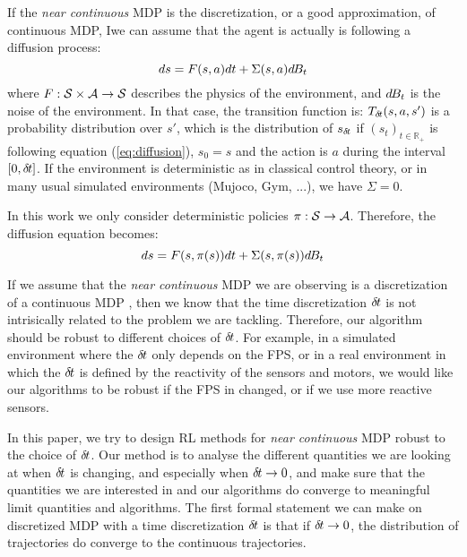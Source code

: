 
If the \emph{near continuous} MDP is the discretization, or a good approximation, of continuous MDP, Iwe can assume that the agent is actually is following a diffusion process:
\begin{equation}
  \label{eq:diffusion}
  ds = F(s, a)dt + \Sigma(s, a)d\hspace{-.1em}B_t
\end{equation}
where $F: {\cal S}\times{\cal A}\rightarrow {\cal S}$ describes the physics of the environment, and $d\hspace{-.1em}B_t$ is the noise of the environment. In that case, the transition function is: $T_{\delta\hspace{-.1em}t}(s, a, s')$ is a probability distribution over $s'$, which is the distribution of $s_{\delta\hspace{-.1em}t}$ if $(s_t)_{t\in\mathbb{R_+}}$ is following equation (\ref{eq:diffusion}), $s_0 = s$ and the action is $a$ during the interval $[0, {\delta\hspace{-.1em}t}]$. If the environment is deterministic as in classical control theory, or in many usual simulated environments (Mujoco, Gym, ...), we have $\Sigma = 0$.

In this work we only consider deterministic policies $\pi: {\cal S} \rightarrow {\cal A}$. Therefore, the diffusion equation becomes:
\begin{equation}
  \label{eq:diffusion-policy}
  ds = F(s, \pi(s))dt + \Sigma(s, \pi(s))d\hspace{-.1em}B_t
\end{equation}

If we assume that the \emph{near continuous} MDP we are observing is a discretization of a continuous MDP , then we know that the time discretization ${\delta\hspace{-.1em}t}$ is not intrisically related to the problem we are tackling. Therefore, our algorithm should be robust to different choices of ${\delta\hspace{-.1em}t}$. For example, in a simulated environment where the ${\delta\hspace{-.1em}t}$ only depends on the FPS, or in a real environment in which the ${\delta\hspace{-.1em}t}$ is defined by the reactivity of the sensors and motors, we would like our algorithms to be robust if the FPS in changed, or if we use more reactive sensors.

In this paper, we try to design RL methods for \emph{near continuous} MDP robust to the choice of ${\delta\hspace{-.1em}t}$. Our method is to analyse the different quantities we are looking at when ${\delta\hspace{-.1em}t}$ is changing, and especially when ${\delta\hspace{-.1em}t} \rightarrow 0$, and make sure that the quantities we are interested in and our algorithms do converge to meaningful limit quantities and algorithms.  The first formal statement we can make on discretized MDP with a time discretization ${\delta\hspace{-.1em}t}$ is that if ${\delta\hspace{-.1em}t} \rightarrow 0$, the distribution of trajectories do converge to the continuous trajectories.

